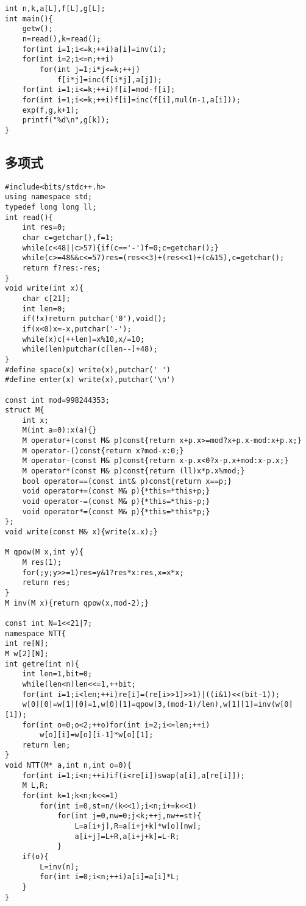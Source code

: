 \documentclass[12pt]{ctexart}
\begin{document}
\begin{lstlisting}
int n,k,a[L],f[L],g[L];
int main(){
	getw();
	n=read(),k=read();
	for(int i=1;i<=k;++i)a[i]=inv(i);
	for(int i=2;i<=n;++i)
		for(int j=1;i*j<=k;++j)
			f[i*j]=inc(f[i*j],a[j]);
	for(int i=1;i<=k;++i)f[i]=mod-f[i];
	for(int i=1;i<=k;++i)f[i]=inc(f[i],mul(n-1,a[i]));
	exp(f,g,k+1);
	printf("%d\n",g[k]);
}
\end{lstlisting}

\subsection{多项式}

\begin{lstlisting}
#include<bits/stdc++.h>
using namespace std;
typedef long long ll;
int read(){
	int res=0;
	char c=getchar(),f=1;
	while(c<48||c>57){if(c=='-')f=0;c=getchar();}
	while(c>=48&&c<=57)res=(res<<3)+(res<<1)+(c&15),c=getchar();
	return f?res:-res;
}
void write(int x){
	char c[21];
	int len=0;
	if(!x)return putchar('0'),void();
	if(x<0)x=-x,putchar('-');
	while(x)c[++len]=x%10,x/=10;
	while(len)putchar(c[len--]+48);
}
#define space(x) write(x),putchar(' ')
#define enter(x) write(x),putchar('\n')

const int mod=998244353;
struct M{
	int x;
	M(int a=0):x(a){}
	M operator+(const M& p)const{return x+p.x>=mod?x+p.x-mod:x+p.x;}
	M operator-()const{return x?mod-x:0;}
	M operator-(const M& p)const{return x-p.x<0?x-p.x+mod:x-p.x;}
	M operator*(const M& p)const{return (ll)x*p.x%mod;}
	bool operator==(const int& p)const{return x==p;}
	void operator+=(const M& p){*this=*this+p;}
	void operator-=(const M& p){*this=*this-p;}
	void operator*=(const M& p){*this=*this*p;}
};
void write(const M& x){write(x.x);}

M qpow(M x,int y){
	M res(1);
	for(;y;y>>=1)res=y&1?res*x:res,x=x*x;
	return res;
}
M inv(M x){return qpow(x,mod-2);}

const int N=1<<21|7;
namespace NTT{
int re[N];
M w[2][N];
int getre(int n){
	int len=1,bit=0;
	while(len<n)len<<=1,++bit;
	for(int i=1;i<len;++i)re[i]=(re[i>>1]>>1)|((i&1)<<(bit-1));
	w[0][0]=w[1][0]=1,w[0][1]=qpow(3,(mod-1)/len),w[1][1]=inv(w[0][1]);
	for(int o=0;o<2;++o)for(int i=2;i<=len;++i)
		w[o][i]=w[o][i-1]*w[o][1];
	return len;
}
void NTT(M* a,int n,int o=0){
	for(int i=1;i<n;++i)if(i<re[i])swap(a[i],a[re[i]]);
	M L,R;
	for(int k=1;k<n;k<<=1)
		for(int i=0,st=n/(k<<1);i<n;i+=k<<1)
			for(int j=0,nw=0;j<k;++j,nw+=st){
				L=a[i+j],R=a[i+j+k]*w[o][nw];
				a[i+j]=L+R,a[i+j+k]=L-R;
			}
	if(o){
		L=inv(n);
		for(int i=0;i<n;++i)a[i]=a[i]*L;
	}
}


\end{lstlisting}
\end{document}
